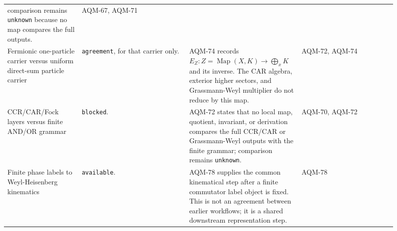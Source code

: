 \begin{center}
\begin{tabular}{p{0.18\linewidth}p{0.26\linewidth}p{0.25\linewidth}p{0.23\linewidth}}
comparison remains \texttt{unknown} because no map compares the full outputs. &
AQM-67, AQM-71 \\
\addlinespace
Fermionic one-particle carrier versus uniform direct-sum particle carrier &
\texttt{agreement}, for that carrier only. &
AQM-74 records \(E_Z:Z=\operatorname{Map}(X,K)\to\bigoplus_xK\) and its
inverse.  The CAR algebra, exterior higher sectors, and Grassmann-Weyl
multiplier do not reduce by this map. &
AQM-72, AQM-74 \\
\addlinespace
CCR/CAR/Fock layers versus finite AND/OR grammar &
\texttt{blocked}. &
AQM-72 states that no local map, quotient, invariant, or derivation compares
the full CCR/CAR or Grassmann-Weyl outputs with the finite grammar; comparison
remains \texttt{unknown}. &
AQM-70, AQM-72 \\
\addlinespace
Finite phase labels to Weyl-Heisenberg kinematics &
\texttt{available}. &
AQM-78 supplies the common kinematical step after a finite commutator label
object is fixed.  This is not an agreement between earlier workflows; it is a
shared downstream representation step. &
AQM-78 \\
\bottomrule
\end{tabular}
\end{center}

